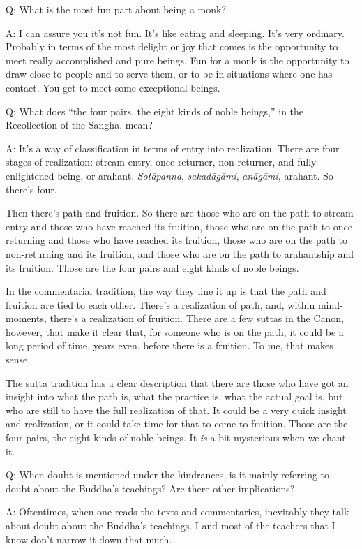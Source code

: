 \qaspace
Q: What is the most fun part about being a monk?

\qaspace
A: I can assure you it’s not fun. It’s like eating and sleeping. It’s
very ordinary. Probably in terms of the most delight or joy that comes
is the opportunity to meet really accomplished and pure beings. Fun for
a monk is the opportunity to draw close to people and to serve them, or
to be in situations where one has contact. You get to meet some
exceptional beings.

\qaspace
Q: What does “the four pairs, the eight kinds of noble beings,” in the
Recollection of the Sangha, mean?

\qaspace
A: It’s a way of classification in terms of entry into realization.
There are four stages of realization: stream-entry, once-returner,
non-returner, and fully enlightened being, or arahant. \emph{Sotāpanna},
\emph{sakadāgāmi}, \emph{anāgāmi}, arahant. So there’s four.

Then there’s path and fruition. So there are those who are on the path
to stream-entry and those who have reached its fruition, those who are
on the path to once-returning and those who have reached its fruition,
those who are on the path to non-returning and its fruition, and those
who are on the path to arahantship and its fruition. Those are the four
pairs and eight kinds of noble beings.

In the commentarial tradition, the way they line it up is that the path
and fruition are tied to each other. There’s a realization of path, and,
within mind-moments, there’s a realization of fruition. There are a few
suttas in the Canon, however, that make it clear that, for someone who
is on the path, it could be a long period of time, years even, before
there is a fruition. To me, that makes sense.

The sutta tradition has a clear description that there are those who
have got an insight into what the path is, what the practice is, what
the actual goal is, but who are still to have the full realization of
that. It could be a very quick insight and realization, or it could take
time for that to come to fruition. Those are the four pairs, the eight
kinds of noble beings. It \emph{is} a bit mysterious when we chant it.

\qaspace
Q: When doubt is mentioned under the hindrances, is it mainly referring
to doubt about the Buddha’s teachings? Are there other implications?

\qaspace
A: Oftentimes, when one reads the texts and commentaries, inevitably
they talk about doubt about the Buddha’s teachings. I and most of the
teachers that I know don’t narrow it down that much.

